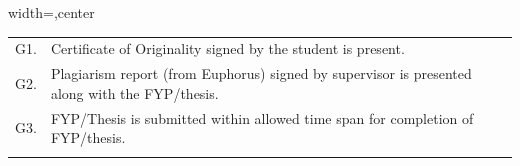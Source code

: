 \begin{table}[!ht]
\begin{adjustbox}{width=\linewidth,center}
\begin{tabular}{p{0.6cm}p{9cm}p{0.6cm}}
G1.            & Certificate of Originality signed by   the student is present.                                                  &  \\
G2.            & Plagiarism   report (from Euphorus) signed by supervisor is presented along with the   FYP/thesis.                  &  \\
G3.            & FYP/Thesis is submitted   within allowed time span for completion of FYP/thesis.                                        &  \\
               &                                                                                                                 &  \\
\end{tabular}
\end{adjustbox}
\end{table}

